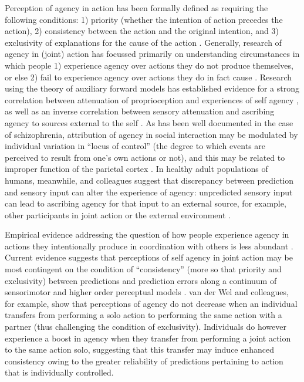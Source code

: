 \begin{CJK}{UTF8}{gbsn}
Perception of agency in action has been formally defined as requiring the following conditions: 1) priority (whether the intention of action precedes the action), 2) consistency between the action and the original intention, and 3) exclusivity of explanations for the cause of the action \citep{Wegner1999}.  Generally, research of agency in (joint) action has focussed primarily on understanding circumstances in which people 1) experience agency over actions they do not produce themselves, or else 2) fail to experience agency over actions they do in fact cause \citep[see][]{VanderWel2012}.  Research using the theory of auxiliary forward models has established evidence for a strong correlation between attenuation of proprioception and experiences of self agency \citep{Wolpert2003,Sato2008}, as well as an inverse correlation between sensory attenuation and ascribing agency to sources external to the self \citep{Brown2013}.  As has been well documented in the case of schizophrenia, attribution of agency in social interaction may be modulated by individual variation in ``locus of control'' (the degree to which events are perceived to result from one’s own actions or not), and this may be related to improper function of the parietal cortex \citep{Frith2000}. In healthy adult populations of humans, meanwhile, \textcite{Sato2008} and colleagues suggest that discrepancy between prediction and sensory input can alter the experience of agency:  unpredicted sensory input can lead to ascribing agency for that input to an external source, for example, other participants in joint action or the external environment \citep{Sato2005,Frith2007}.

Empirical evidence addressing the question of how people experience agency in actions they intentionally produce in coordination with others is less abundant \citep[but see][]{VanderWel2012,VanderWel2013}. Current evidence suggests that perceptions of self agency in joint action may be most contingent on the condition of ``consistency'' (more so that priority and exclusivity) between predictions and prediction errors along a continuum of sensorimotor and higher order perceptual models \citep[see][]{VanderWel2012}.  van der Wel and colleagues, for example, show that perceptions of agency do not decrease when an individual transfers from performing a solo action to performing the same action with a partner (thus challenging the condition of exclusivity).  Individuals do however experience a boost in agency when they transfer from performing a joint action to the same action solo, suggesting that this transfer may induce enhanced consistency owing to the greater reliability of predictions pertaining to action that is individually controlled.


\end{CJK}
